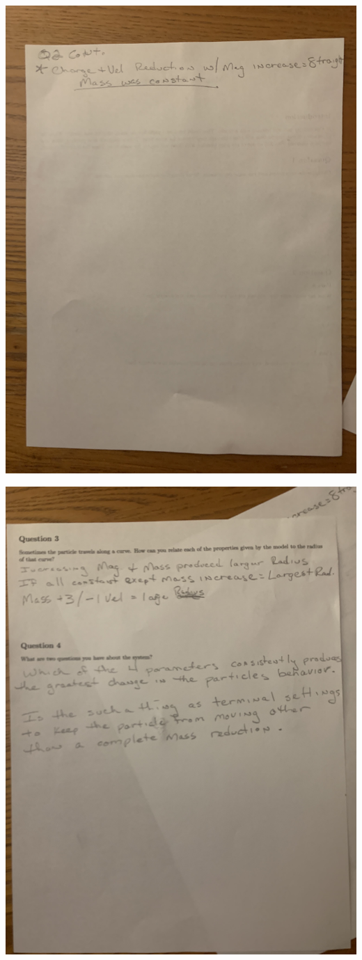 \documentclass[11pt]{article}
\begin{document}
		\includegraphics[scale = 0.15]{IMG_2}
		
		\includegraphics[scale = 0.15]{IMG_3}
		
\end{document}
